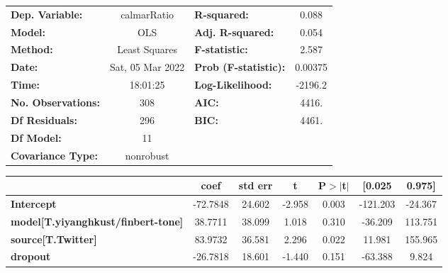 \begin{center}
\begin{tabular}{lclc}
\toprule
\textbf{Dep. Variable:}                    &   calmarRatio    & \textbf{  R-squared:         } &     0.088   \\
\textbf{Model:}                            &       OLS        & \textbf{  Adj. R-squared:    } &     0.054   \\
\textbf{Method:}                           &  Least Squares   & \textbf{  F-statistic:       } &     2.587   \\
\textbf{Date:}                             & Sat, 05 Mar 2022 & \textbf{  Prob (F-statistic):} &  0.00375    \\
\textbf{Time:}                             &     18:01:25     & \textbf{  Log-Likelihood:    } &   -2196.2   \\
\textbf{No. Observations:}                 &         308      & \textbf{  AIC:               } &     4416.   \\
\textbf{Df Residuals:}                     &         296      & \textbf{  BIC:               } &     4461.   \\
\textbf{Df Model:}                         &          11      & \textbf{                     } &             \\
\textbf{Covariance Type:}                  &    nonrobust     & \textbf{                     } &             \\
\bottomrule
\end{tabular}
\begin{tabular}{lcccccc}
                                           & \textbf{coef} & \textbf{std err} & \textbf{t} & \textbf{P$> |$t$|$} & \textbf{[0.025} & \textbf{0.975]}  \\
\midrule
\textbf{Intercept}                         &     -72.7848  &       24.602     &    -2.958  &         0.003        &     -121.203    &      -24.367     \\
\textbf{model[T.yiyanghkust/finbert-tone]} &      38.7711  &       38.099     &     1.018  &         0.310        &      -36.209    &      113.751     \\
\textbf{source[T.Twitter]}                 &      83.9732  &       36.581     &     2.296  &         0.022        &       11.981    &      155.965     \\
\textbf{dropout}                           &     -26.7818  &       18.601     &    -1.440  &         0.151        &      -63.388    &        9.824     \\

\end{tabular}
\end{center}
